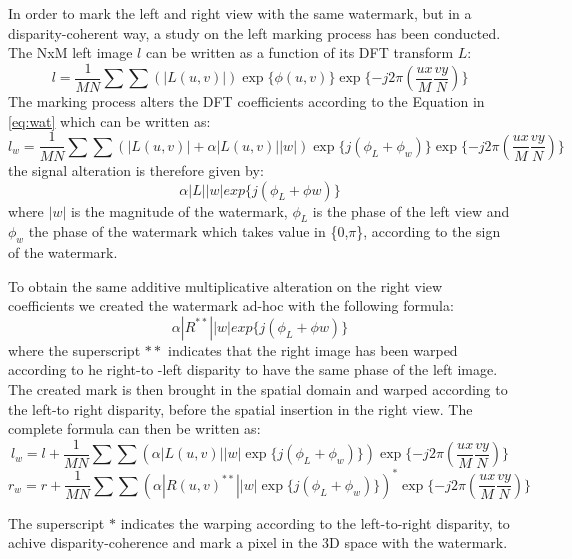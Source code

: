 In order to mark the left and right view with the same watermark, but in a disparity-coherent way, a study on the left marking process has been conducted.\\
The NxM left image $l$ can be written as a function of its DFT transform $L$:
$$ l =  \frac{1}{MN}\sum\sum(|L(u,v)|)\exp\{\phi (u,v)\} \exp\{-j2\pi(\frac{ux}{M}\frac{vy}{N})\}  $$
The marking process alters the DFT coefficients according to the Equation in \ref{eq:wat}
which can be written as:
$$ l_{w} = \frac{1}{MN}\sum\sum(|L(u,v)| + \alpha|L(u,v)||w|)\exp\{j(\phi_{L}+\phi_{w})\}\exp\{-j2\pi(\frac{ux}{M}\frac{vy}{N})\} $$
the signal alteration is therefore given by:
$$ \alpha|L||w|exp\{j(\phi_{L}+\phi{w})\} $$ 
where $|w|$ is the magnitude of the watermark, $\phi_{L}$ is the phase of the left view and $ \phi_{w}$ the phase of the watermark which takes value in \{0,$\pi$\}, according to the sign of the watermark.


To obtain the same additive multiplicative alteration on the right view coefficients we created the watermark ad-hoc with the following formula: 
$$ \alpha|R^{**}||w|exp\{j(\phi_{L}+\phi{w})\} $$ 
where the superscript $**$ indicates that the right image has been warped according to he right-to -left disparity to have the same phase of the left image.
The created mark is then brought in the spatial domain and warped according to the left-to right disparity, before the spatial insertion in the right view.
The complete formula can then be written as: 
$$ l_{w} = l + \frac{1}{MN}\sum\sum(\alpha|L(u,v)||w|\exp\{j(\phi_{L}+\phi_{w})\})\exp\{-j2\pi(\frac{ux}{M}\frac{vy}{N})\} $$
$$ r_{w} = r + \frac{1}{MN}\sum\sum(\alpha|R(u,v)^{**}||w|\exp\{j(\phi_{L}+\phi_{w})\})^{*}\exp\{-j2\pi(\frac{ux}{M}\frac{vy}{N})\} $$

The superscript $*$ indicates the warping according to the left-to-right disparity, to achive disparity-coherence and mark a pixel in the 3D space with the watermark.

